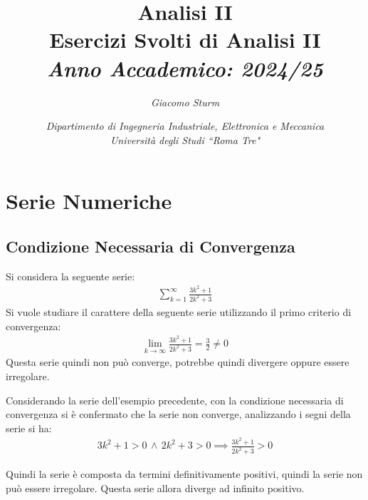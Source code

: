 \documentclass{article}
\numberwithin{equation}{subsection}
\begin{document}
\title{%
    \textbf{Analisi II}  \\ 
    \large Esercizi Svolti di Analisi II \\
    \textit{Anno Accademico: 2024/25}}
\author{\textit{Giacomo Sturm}}
\date{\textit{Dipartimento di Ingegneria Industriale, Elettronica e Meccanica \\
Università degli Studi ``Roma Tre"}} 

\maketitle
\thispagestyle{link}

\clearpage


\pagestyle{fancy}
\fancyhead{}\fancyfoot{}
\fancyfoot[C]{\thepage}

\tableofcontents

\clearpage
{}

\section{Serie Numeriche}

\subsection{Condizione Necessaria di Convergenza}

Si considera la seguente serie:
\begin{gather*}
    \displaystyle\sum_{k=1}^\infty\frac{3k^2+1}{2k^2+3}
\end{gather*}
Si vuole studiare il carattere della seguente serie utilizzando il primo criterio di convergenza:
\begin{gather*}
    \lim_{k\to\infty}\displaystyle\frac{3k^2+1}{2k^2+3}=\frac{3}{2}\neq0
\end{gather*}
Questa serie quindi non può converge, potrebbe quindi divergere oppure essere irregolare. 


Considerando la serie dell'esempio precedente, con la condizione necessaria di convergenza si è confermato che la serie non converge, analizzando i segni della serie si ha:
\begin{gather*}
    3k^2+1>0\,\land\,2k^2+3>0\implies\displaystyle\frac{3k^2+1}{2k^2+3}>0
\end{gather*}

Quindi la serie è composta da termini definitivamente positivi, quindi la serie non può essere irregolare. Questa serie allora diverge ad infinito positivo. 
\end{document}
